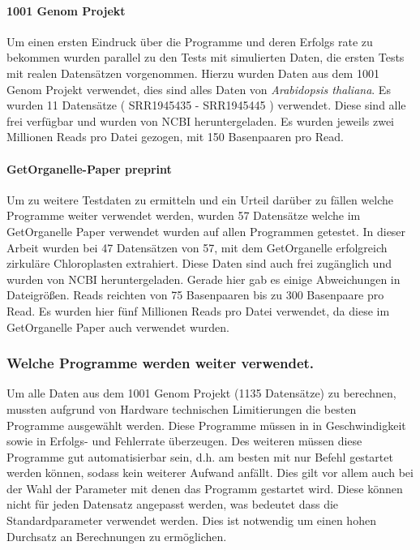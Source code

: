 \documentclass{scrartcl}
\begin{document}
\paragraph{1001 Genom Projekt}
\label{sec-3-1-1-2}
Um einen ersten Eindruck über die Programme und deren Erfolgs rate zu bekommen wurden parallel zu den Tests mit simulierten Daten, die ersten Tests mit realen Datensätzen vorgenommen. 
Hierzu wurden Daten aus dem 1001 Genom Projekt\footnotemark[41]{} verwendet, dies sind alles Daten von \emph{Arabidopsis thaliana}. Es wurden 11 Datensätze ( SRR1945435 - SRR1945445 ) verwendet. Diese sind alle
frei verfügbar und wurden von NCBI heruntergeladen. Es wurden jeweils zwei Millionen Reads pro Datei gezogen, mit 150 Basenpaaren pro Read. 

\paragraph{GetOrganelle-Paper preprint}
\label{sec-3-1-1-3}
Um zu weitere Testdaten zu ermitteln und ein Urteil darüber zu fällen welche Programme weiter verwendet werden,
wurden 57 Datensätze welche im GetOrganelle Paper \footnotemark[30]{} verwendet wurden
auf allen Programmen getestet. In dieser Arbeit wurden bei 47 Datensätzen von 57, mit
dem GetOrganelle erfolgreich zirkuläre Chloroplasten extrahiert. Diese Daten sind auch frei zugänglich und wurden
von NCBI heruntergeladen. Gerade hier gab es einige Abweichungen in Dateigrößen. Reads reichten von 75 Basenpaaren 
bis zu 300 Basenpaare pro Read. Es wurden hier fünf Millionen Reads pro Datei verwendet, da diese im GetOrganelle Paper
auch verwendet wurden.

\subsubsection{Welche Programme werden weiter verwendet.}
\label{sec-3-1-2}
Um alle Daten aus dem 1001 Genom Projekt (1135 Datensätze) zu berechnen, mussten aufgrund 
von Hardware technischen Limitierungen die besten Programme ausgewählt werden. Diese Programme müssen in
in Geschwindigkeit sowie in Erfolgs- und Fehlerrate überzeugen. Des weiteren müssen diese Programme gut automatisierbar sein, 
d.h. am besten mit nur Befehl gestartet werden können, sodass kein weiterer Aufwand anfällt. Dies gilt
vor allem auch bei der Wahl der Parameter mit denen das Programm gestartet wird. Diese können nicht 
für jeden Datensatz angepasst werden, was bedeutet dass die Standardparameter verwendet werden.
Dies ist notwendig um einen hohen Durchsatz an Berechnungen zu ermöglichen.
\end{document}

